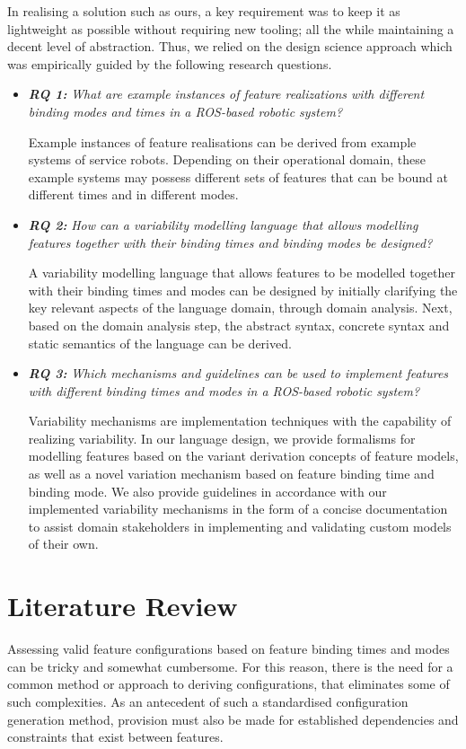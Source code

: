 \documentclass[conference]{IEEEtran}
\begin{document}
In realising a solution such as ours, a key requirement was to keep it as lightweight as possible without requiring new tooling; all the while maintaining a decent level of abstraction. Thus, we relied on the design science approach which was empirically guided by the following research questions.
\begin{itemize}
     \item \textit{\textbf{RQ 1:}} \emph{What are example instances of feature realizations with different binding modes and times in a ROS-based robotic system?}
     
     Example instances of feature realisations can be derived from example systems of service robots. Depending on their operational domain, these example systems may possess different sets of features that can be bound at different times and in different modes.
    
    \item \textit{\textbf{RQ 2:}} \emph{How can a variability modelling language that allows modelling features together with their binding times and binding modes be designed?}
    
    A variability modelling language that allows features to be modelled together with their binding times and modes can be designed by initially clarifying the key relevant aspects of the language domain, through domain analysis. Next, based on the domain analysis step, the abstract syntax, concrete syntax and static semantics of the language can be derived.
    
    \item \textit{\textbf{RQ 3:}} \emph{Which mechanisms and guidelines can be used to implement features with different binding times and modes in a ROS-based robotic system?}
    
    Variability mechanisms are implementation techniques with the capability of realizing variability. In our language design, we provide formalisms for modelling features based on the variant derivation concepts of feature models, as well as a novel variation mechanism based on feature binding time and binding mode. We also provide guidelines in accordance with our implemented variability mechanisms in the form of a concise documentation to assist domain stakeholders in implementing and validating custom models of their own.
\end{itemize}

\section{Literature Review}
Assessing valid feature configurations based on feature binding times and modes can be tricky and somewhat cumbersome. For this reason, there is the need for a common method or approach to deriving configurations, that eliminates some of such complexities. As an antecedent of such a standardised configuration generation method, provision must also be made for established dependencies and constraints that exist between features.
\end{document}
